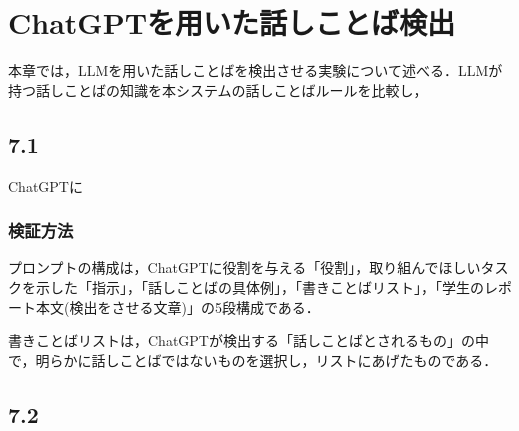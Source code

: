 \chapter{ChatGPTを用いた話しことば検出 \label{c7}}

本章では，LLMを用いた話しことばを検出させる実験について述べる．LLMが持つ話しことばの知識を本システムの話しことばルールを比較し，
\begin{comment}
書きことばリストは、話しことばチェッカーで検出しない表現をもとに選んでいる。
それでもchatGPTが出力する場合は、チェッカーの癖もあり得る。← これは要相談
\end{comment}
\section{7.1 \label{c7s1}}
ChatGPTに

\subsection{検証方法}
プロンプトの構成は，ChatGPTに役割を与える「役割」，取り組んでほしいタスクを示した「指示」，「話しことばの具体例」，「書きことばリスト」，「学生のレポート本文(検出をさせる文章)」の5段構成である．




書きことばリストは，ChatGPTが検出する「話しことばとされるもの」の中で，明らかに話しことばではないものを選択し，リストにあげたものである．

\section{7.2 \label{c7s2}}
